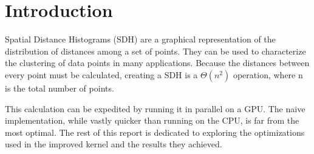	\section{Introduction}
	\hspace{\parindent}Spatial Distance Histograms (SDH) are a graphical representation of the distribution of distances among a set of points. They can be used to characterize the clustering of data points in many applications. Because the distances between every point must be calculated, creating a SDH is a $\Theta(n^2)$ operation, where n is the total number of points.
	
	This calculation can be expedited by running it in parallel on a GPU. The naive implementation, while vastly quicker than running on the CPU, is far from the most optimal. The rest of this report is dedicated to exploring the optimizations used in the improved kernel and the results they achieved.%